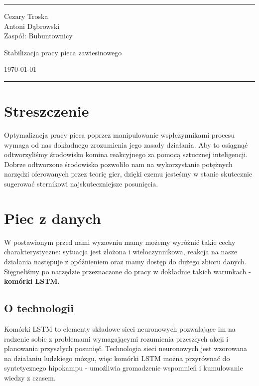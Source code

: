 \documentclass[11pt]{article}
\begin{document}

\hrule \medskip %
\begin{minipage}{0.295\textwidth}
\raggedright
\footnotesize
Cezary Troska \hfill\\
Antoni Dąbrowski \hfill\\
Zaspół: Bubuntownicy
\end{minipage}
\begin{minipage}{0.4\textwidth}
\centering
\large
Stabilizacja pracy pieca zawiesinowego\\
\normalsize

\end{minipage}
\begin{minipage}{0.295\textwidth}
\raggedleft
\today\hfill\\
\end{minipage}
\medskip\hrule
\bigskip



\section{Streszczenie}
Optymalizacja pracy pieca poprzez manipulowanie wspłczynnikami procesu wymaga od nas dokładnego zrozumienia jego zasady działania. Aby to osiągnąć odtworzyliśmy środowisko komina reakcyjnego za pomocą sztucznej inteligencji. Dobrze odtworzone środowisko pozwoliło nam na wykorzystanie potężnych narzędzi oferowanych przez teorię gier, dzięki czemu jesteśmy w stanie skutecznie sugerować sternikowi najskuteczniejsze posunięcia.

\section{Piec z danych}
W postawionym przed nami wyzawniu mamy możemy wyróżnić takie cechy charakterystyczne: sytuacja jest złożona i wieloczynnikowa, reakcja na nasze działania następuje z opóźnieniem oraz mamy dostęp do dużego zbioru danych. Sięgneliśmy po narzędzie przeznaczone do pracy w dokładnie takich warunkach - \textbf{komórki LSTM}.

\subsection{O technologii}

Komórki LSTM to elementy składowe sieci neuronowych pozwalające im na radzenie sobie z problemami wymagającymi rozumienia przeszłych akcji i planowania przyszłych posunięć. Technologia sieci neuronowych jest wzorowana na działaniu ludzkiego mózgu, więc komórki LSTM można przyrównać do syntetycznego hipokampu - umożliwia gromadzenie wspomnień i kumulowanie wiedzy z czasem. \\
\end{document}
